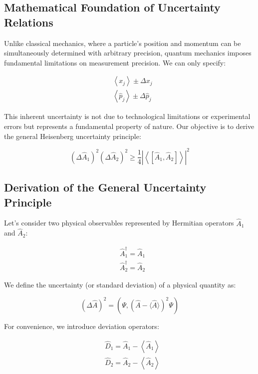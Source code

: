 \documentclass[italian]{HKNdocument}
\begin{document}
\subsection{Mathematical Foundation of Uncertainty Relations}

Unlike classical mechanics, where a particle's position and momentum can be simultaneously determined with arbitrary precision, quantum mechanics imposes fundamental limitations on measurement precision. We can only specify:

\begin{align}
& \left\langle x_{j}\right\rangle \pm \Delta x_{j} \\
& \left\langle\hat{p}_{j}\right\rangle \pm \Delta \hat{p}_{j} \label{eq:7.1}
\end{align}

This inherent uncertainty is not due to technological limitations or experimental errors but represents a fundamental property of nature. Our objective is to derive the general Heisenberg uncertainty principle:

\begin{equation}
\left(\Delta \hat{A}_{1}\right)^{2}\left(\Delta \hat{A}_{2}\right)^{2} \geq \frac{1}{4}\left|\left\langle\left[\hat{A}_{1}, \hat{A}_{2}\right]\right\rangle\right|^{2} \label{eq:7.2}
\end{equation}


\subsection{Derivation of the General Uncertainty Principle}

Let's consider two physical observables represented by Hermitian operators $\hat{A}_1$ and $\hat{A}_2$:

\begin{align}
& \hat{A}_{1}^{\dagger}=\hat{A}_{1} \\
& \hat{A}_{2}^{\dagger}=\hat{A}_{2} \label{eq:7.3}
\end{align}

We define the uncertainty (or standard deviation) of a physical quantity as:

\begin{equation}
(\Delta \hat{A})^{2}=\left(\Psi,(\hat{A}-\langle\hat{A}\rangle)^{2} \Psi\right) \label{eq:7.4}
\end{equation}

For convenience, we introduce deviation operators:

\begin{align}
& \hat{D}_{1}=\hat{A}_{1}-\left\langle\hat{A}_{1}\right\rangle \\
& \hat{D}_{2}=\hat{A}_{2}-\left\langle\hat{A}_{2}\right\rangle \label{eq:7.5}
\end{align}
\end{document}
